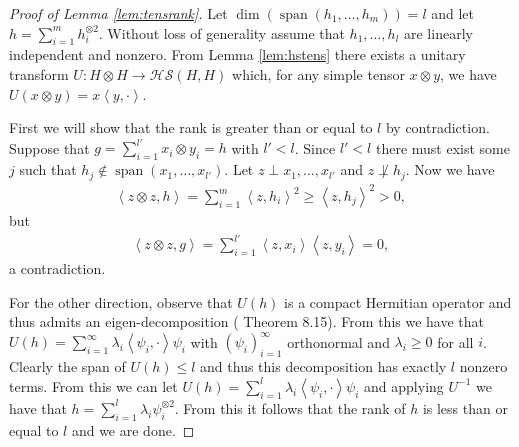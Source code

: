 \documentclass[aos]{imsart}
\def\l{\left}
\def\r{\right}
\def\hs{\mathscr{HS}}
\def\span{\operatorname{span}}
\def\span{\operatorname{span}}
\theoremstyle{plain}
\theoremstyle{defintion}
\begin{document}
	\begin{proof}[Proof of Lemma \ref{lem:tensrank}]
		Let $\dim\left( \span\left( h_1,\ldots,h_m \right) \right)= l$ and let $h = \sum_{i=1}^m h_i^{\otimes 2}$. Without loss of generality assume that $h_1,\ldots,h_l$ are linearly independent and nonzero. From Lemma \ref{lem:hstens} there exists a unitary transform  $U:H\otimes H \to \hs\left( H,H \right)$ which, for any simple tensor $x\otimes y$, we have $U(x\otimes y) = x\l<y,\cdot\r>$.

		First we will show that the rank is greater than or equal to $l$ by contradiction. Suppose that $g = \sum_{i=1}^{l'}x_i \otimes y_i = h$ with $l'<l$. Since $l'<l$ there must exist some $j$ such that $h_j \notin \span\left( x_1,\ldots,x_{l'} \right)$. Let $z\perp x_1,\ldots,x_{l'}$ and $z \not\perp h_j$. Now we have
		\begin{eqnarray*}
			\l<z\otimes z, h\r> = \sum_{i=1}^m \l<z,h_i\r>^2 \ge \l<z,h_j\r>^2 > 0,
		\end{eqnarray*}
		but 
		\begin{eqnarray*}
			\l<z\otimes z, g\r> = \sum_{i=1}^{l'} \l<z,x_i\r> \l<z, y_i\r> = 0,
		\end{eqnarray*}
		a contradiction.

		For the other direction, observe that $U(h)$ is a compact Hermitian operator and thus admits an eigen-decomposition (\cite{introhilb} Theorem 8.15). From this we have that $U(h) = \sum_{i=1}^\infty \lambda_i \l<\psi_i, \cdot\r> \psi_i$  with $\left( \psi_i \right)_{i=1}^\infty$ orthonormal and $\lambda_i\ge 0$ for all $i$. Clearly the span of $U\left( h \right) \le l$ and thus this decomposition has exactly $l$ nonzero terms. From this we can let $U(h) = \sum_{i=1}^l \lambda_i \l<\psi_i, \cdot\r> \psi_i$ and applying $U^{-1}$ we have that $h=\sum_{i=1}^l \lambda_i \psi_i^{\otimes 2}$. From this it follows that the rank of $h$ is less than or equal to $l$ and we are done.
	\end{proof}
\end{document}
